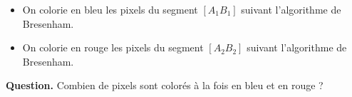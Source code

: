 \documentclass[class=report,crop=false, 12pt]{standalone}
\begin{document}
\begin{enigme}[Pixels]

\sauteligne

\begin{itemize}
  \item On colorie en bleu les pixels du segment $[A_1B_1]$ suivant l'algorithme de Bresenham.
  \item On colorie en rouge les pixels du segment $[A_2B_2]$ suivant l'algorithme de Bresenham.
\end{itemize}


 
\bigskip

\textbf{Question.} Combien de pixels sont colorés à la fois en bleu et en rouge ?

%
%

\end{enigme}
\end{document}
